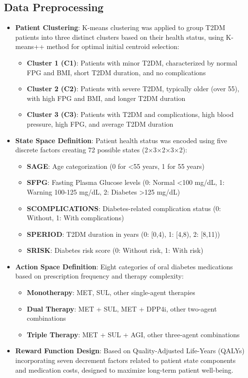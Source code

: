 \subsection*{Data Preprocessing}
\begin{itemize}
    \item \textbf{Patient Clustering}: K-means clustering was applied to group T2DM patients into three distinct clusters based on their health status, using K-means++ method for optimal initial centroid selection:
    \begin{itemize}
        \item \textbf{Cluster 1 (C1)}: Patients with minor T2DM, characterized by normal FPG and BMI, short T2DM duration, and no complications
        \item \textbf{Cluster 2 (C2)}: Patients with severe T2DM, typically older (over 55), with high FPG and BMI, and longer T2DM duration
        \item \textbf{Cluster 3 (C3)}: Patients with T2DM and complications, high blood pressure, high FPG, and average T2DM duration
    \end{itemize}
    \item \textbf{State Space Definition}: Patient health status was encoded using five discrete factors creating 72 possible states (2×3×2×3×2):
    \begin{itemize}
        \item \textbf{SAGE}: Age categorization (0 for <55 years, 1 for 55 years)
        \item \textbf{SFPG}: Fasting Plasma Glucose levels (0: Normal <100 mg/dL, 1: Warning 100-125 mg/dL, 2: Diabetes >125 mg/dL)
        \item \textbf{SCOMPLICATIONS}: Diabetes-related complication status (0: Without, 1: With complications)
        \item \textbf{SPERIOD}: T2DM duration in years (0: [0,4), 1: [4,8), 2: [8,11))
        \item \textbf{SRISK}: Diabetes risk score (0: Without risk, 1: With risk)
    \end{itemize}
    \item \textbf{Action Space Definition}: Eight categories of oral diabetes medications based on prescription frequency and therapy complexity:
    \begin{itemize}
        \item \textbf{Monotherapy}: MET, SUL, other single-agent therapies
        \item \textbf{Dual Therapy}: MET + SUL, MET + DPP4i, other two-agent combinations
        \item \textbf{Triple Therapy}: MET + SUL + AGI, other three-agent combinations
    \end{itemize}
    \item \textbf{Reward Function Design}: Based on Quality-Adjusted Life-Years (QALYs) incorporating seven decrement factors related to patient state components and medication costs, designed to maximize long-term patient well-being.
\end{itemize}

